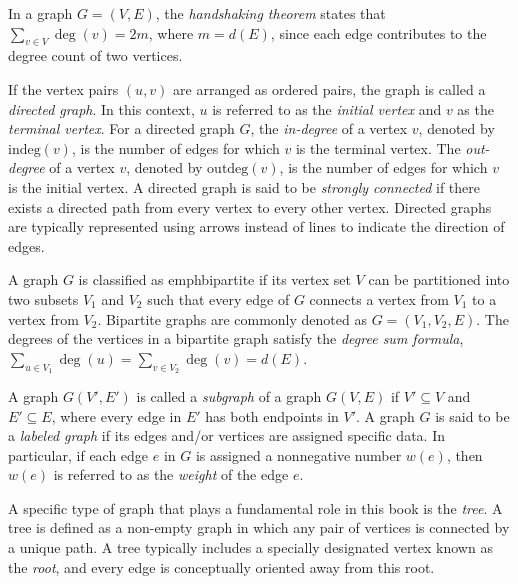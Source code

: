 \begin{example}
In a graph $G = (V, E)$, the \emph{handshaking theorem} states that $\sum_{v \in V} \deg(v) = 2m$, where $m = d(E)$, since each edge contributes to the degree count of two vertices.
\end{example}

If the vertex pairs $(u, v)$ are arranged as ordered pairs, the graph is called a \emph{directed graph}. In this context, $u$ is referred to as the \emph{initial vertex} and $v$ as the \emph{terminal vertex}. For a directed graph $G$, the \emph{in-degree} of a vertex $v$, denoted by $\text{indeg}(v)$, is the number of edges for which $v$ is the terminal vertex. The \emph{out-degree} of a vertex $v$, denoted by $\text{outdeg}(v)$, is the number of edges for which $v$ is the initial vertex. A directed graph is said to be \emph{strongly connected} if there exists a directed path from every vertex to every other vertex. Directed graphs are typically represented using arrows instead of lines to indicate the direction of edges.

A graph $G$ is classified as emph{bipartite} if its vertex set $V$ can be partitioned into two subsets $V_1$ and $V_2$ such that every edge of $G$ connects a vertex from $V_1$ to a vertex from $V_2$. Bipartite graphs are commonly denoted as $G = (V_1, V_2, E)$. The degrees of the vertices in a bipartite graph satisfy the \emph{degree sum formula}, $\sum_{u \in V_1} \deg(u) = \sum_{v \in V_2} \deg(v) = d(E)$.

A graph $G(V', E')$ is called a \emph{subgraph} of a graph $G(V, E)$ if $V' \subseteq V$ and $E' \subseteq E$, where every edge in $E'$ has both endpoints in $V'$. A graph $G$ is said to be a \emph{labeled graph} if its edges and/or vertices are assigned specific data. In particular, if each edge $e$ in $G$ is assigned a nonnegative number $w(e)$, then $w(e)$ is referred to as the \emph{weight} of the edge $e$.

A specific type of graph that plays a fundamental role in this book is the \emph{tree}. A tree is defined as a non-empty graph in which any pair of vertices is connected by a unique path. A tree typically includes a specially designated vertex known as the \emph{root}, and every edge is conceptually oriented away from this root.

